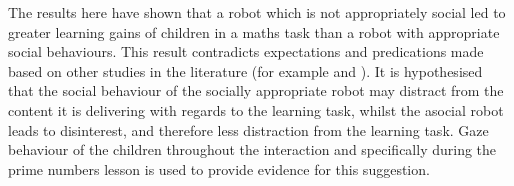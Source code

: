 The results here have shown that a robot which is not appropriately social led to greater \gls{learning} gains of children in a maths task than a robot with appropriate social behaviours. This result contradicts expectations and predications made based on other studies in the literature (for example \citealp{mayer2004personalization} and \citealp{saerbeck2010expressive}). It is hypothesised that the social behaviour of the socially appropriate robot may distract from the content it is delivering with regards to the \gls{learning} task, whilst the asocial robot leads to disinterest, and therefore less distraction from the \gls{learning} task. Gaze behaviour of the children throughout the interaction and specifically during the prime numbers lesson is used to provide evidence for this suggestion.